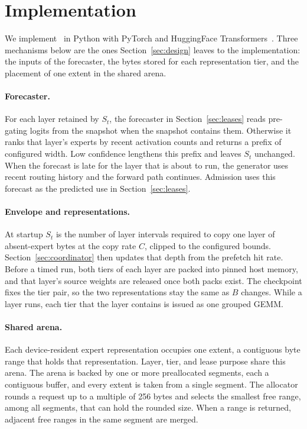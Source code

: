 \section{Implementation}
\label{sec:impl}

We implement \systemname\ in Python with PyTorch and HuggingFace
Transformers~\cite{paszke2019pytorch,wolf2020transformers}.
Three mechanisms below are the ones Section~\ref{sec:design} leaves to the
implementation: the inputs of the forecaster, the bytes stored for each
representation tier, and the placement of one extent in the shared arena.

\paragraph{Forecaster.}
For each layer retained by \(S_t\), the forecaster in
Section~\ref{sec:leases} reads pre-gating logits from the snapshot when the
snapshot contains them.
Otherwise it ranks that layer's experts by recent activation counts and
returns a prefix of configured width.
Low confidence lengthens this prefix and leaves \(S_t\) unchanged.
When the forecast is late for the layer that is about to run, the generator
uses recent routing history and the forward path continues.
Admission uses this forecast as the predicted use in Section~\ref{sec:leases}.

\paragraph{Envelope and representations.}
At startup \(S_t\) is the number of layer intervals required to copy one layer of
absent-expert bytes at the copy rate \(C\), clipped to the configured bounds.
Section~\ref{sec:coordinator} then updates that depth from the prefetch hit rate.
Before a timed run, both tiers of each layer are packed into pinned host
memory, and that layer's source weights are released once both packs exist.
The checkpoint fixes the tier pair, so the two representations stay the same
as \(B\) changes.
While a layer runs, each tier that the layer contains is issued as one
grouped GEMM.

\paragraph{Shared arena.}
Each device-resident expert representation occupies one extent, a contiguous
byte range that holds that representation.
Layer, tier, and lease purpose share this arena.
The arena is backed by one or more preallocated segments, each a contiguous
buffer, and every extent is taken from a single segment.
The allocator rounds a request up to a multiple of 256 bytes and selects the
smallest free range, among all segments, that can hold the rounded size.
When a range is returned, adjacent free ranges in the same segment are merged.

